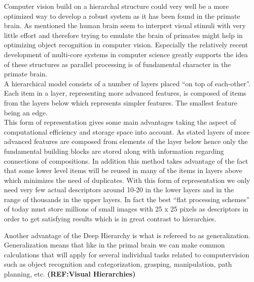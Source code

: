 Computer vision build on a hierarchal structure could very well be a more optimized way to develop a robust system as it has been found in the primate brain. As mentioned the human brain seem to interpret visual stimuli with very little effort and therefore trying to emulate the brain of primates might help in optimizing object recognition in computer vision. Especially the relatively recent development of multi-core systems in computer science greatly supports the idea of these structures as parallel processing is of fundamental character in the primate brain.\citep{fidler2009learning}  \\
A hierarchical model consists of a number of layers placed “on top of each-other”. Each item in a layer, representing more advanced features, is composed of items from the layers below which represents simpler features. The smallest feature being an edge. \\
This form of representation gives some main advantages taking the aspect of computational efficiency and storage space into account. As stated layers of more advanced features are composed from elements of the layer below hence only the fundamental building blocks are stored along with information regarding connections of compositions. In addition this method takes advantage of the fact that some lower level items will be reused in many of the items in layers above which minimizes the need of duplicates. With this form of representation we only need very few actual descriptors around 10-20 in the lower layers and in the range of thousands in the upper layers\citep{fidler2009learning}. 
In fact the best “flat processing schemes” of today must store millions of small images with 25 x 25 pixels as descriptors in order to get satisfying results which is in great contrast to hierarchies.\citep{fidler2009learning}

Another advantage of the Deep Hierarchy is what is refereed to as generalization. Generalization means that like in the primal brain we can make common calculations that will apply for several individual tasks related to computervision such as object recognition and categorization, grasping, manipulation, path planning, etc. \textbf{(REF:Visual Hierarchies)}